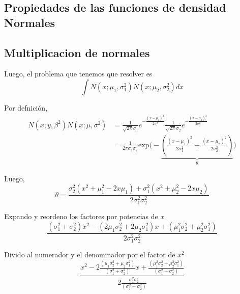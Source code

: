 \documentclass[article]{jss}
\begin{document}
\begin{appendix}
 
 
 
 
 
 
 
 
 
 
 
 
 
 
 
 
 
 

\section{Propiedades de las funciones de densidad Normales}

\subsection{Multiplicacion de normales}\label{multiplicacion_normales}

Luego, el problema que tenemos que resolver es
\begin{equation}
 \int N(x;\mu_1,\sigma_1^2)N(x;\mu_2,\sigma_2^2) dx
\end{equation}

Por defnici\'on,
\begin{equation}
\begin{split}
 N(x;y,\beta^2)N(x;\mu,\sigma^2) & = \frac{1}{\sqrt{2\pi}\sigma_1}e^{-\frac{(x-\mu_1)^2}{2\sigma_1^2}} \frac{1}{\sqrt{2\pi}\sigma_2}e^{-\frac{(x-\mu_2)^2}{2\sigma_2^2}}  \\
 & = \frac{1}{2\pi\sigma_1\sigma_2}\text{exp}\Bigg(-\underbrace{\left( \frac{(x-\mu_1)^2}{2\sigma_1^2} + \frac{(x-\mu_2)^2}{2\sigma_2^2} \right)}_{\theta} \Bigg)
\end{split}
\end{equation}

Luego,
\begin{equation}
 \theta = \frac{\sigma_2^2(x^2 + \mu_1^2 - 2x\mu_1) + \sigma_1^2(x^2 + \mu_2^2 - 2x\mu_2) }{2\sigma_1^2\sigma_2^2}
\end{equation}

Expando y reordeno los factores por potencias de $x$
\begin{equation}
 \frac{(\sigma_1^2 + \sigma_2^2) x^2 - (2\mu_1\sigma_2^2 + 2\mu_2\sigma_1^2) x + (\mu_1^2\sigma_2^2 + \mu_2^2\sigma_1^2)}{2\sigma_1^2\sigma_2^2}
\end{equation}

Divido al numerador y el denominador por el factor de $x^2$
\begin{equation}
 \frac{x^2 - 2\frac{(\mu_1\sigma_2^2 + \mu_2\sigma_1^2)}{(\sigma_1^2 + \sigma_2^2) } x + \frac{(\mu_1^2\sigma_2^2 + \mu_2^2\sigma_1^2)}{(\sigma_1^2 + \sigma_2^2) }}{2\frac{\sigma_1^2\sigma_2^2}{(\sigma_1^2 + \sigma_2^2)}}
\end{equation}


\end{appendix}
\end{document}
